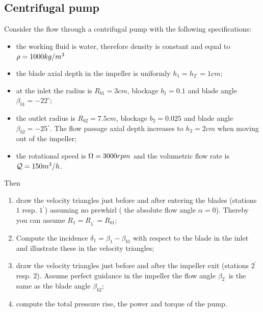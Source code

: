 \clearpage
  
\subsection*{Centrifugal pump}
\label{exercises:pump}

Consider the flow through a centrifugal pump with the following specifications:
\begin{itemize}
\item the working fluid is water, therefore density is constant and
  equal to $\rho = 1000kg/m^3$
\item the blade axial depth in the impeller is uniformly $h_1=h_{2'}=1cm$;
\item at the inlet the radius is $R_{b1}=3cm$, blockage $b_1=0.1$
  and blade angle $\beta_{b1}=-22^\circ$;
\item the outlet radius is $R_{b2}=7.5cm$, blockage $b_2=0.025$ and
  blade angle $\beta_{b2}=-25^\circ$. The flow passage axial depth
  increases to $h_2=2cm$ when moving out of the impeller;
\item the rotational speed is $\Omega=3000rpm$ and the volumetric flow
  rate is $\mathcal Q = 150 m^3/h$.
\end{itemize}
Then 
\begin{enumerate}
\item draw the velocity triangles just before and after entering the
  blades (stations $1$ resp. $1^\prime$) assuming no prewhirl (\ie
  the absolute flow angle $\alpha=0$). Thereby you can assume
  $R_1=R_{1^\prime}=R_{b1}$;
\item Compute the incidence $\delta_1 = \beta_1 - \beta_{b1}$ with
  respect to the blade in the inlet and illustrate these in the
  velocity triangles;
\item draw the velocity triangles just before and after the impeller
  exit (stations $2^\prime$ resp. $2$). Assume perfect guidance in
  the impeller \ie the flow angle $\beta_{2^\prime}$ is the same as
  the blade angle $\beta_{b2}$;
\item compute the total pressure rise, the power and torque of the
  pump.
\end{enumerate}
